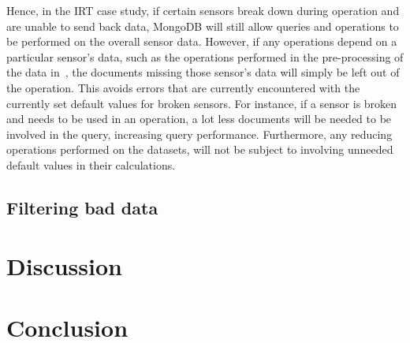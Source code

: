 \documentclass[a4paper,11pt]{article}
\begin{document}
Hence, in the IRT case study, if certain sensors break down during operation and are unable to send back data, MongoDB
will still allow queries and operations to be performed on the overall sensor data. However, if any operations depend on
a particular sensor's data, such as the operations performed in the pre-processing of the data
in~, the documents missing those sensor's data will simply be left out of the operation. This
avoids errors that are currently encountered with the currently set default values for broken sensors. For instance, if
a sensor is broken and needs to be used in an operation, a lot less documents will be needed to be involved in the
query, increasing query performance. Furthermore, any reducing operations performed on the datasets, will not be subject
to involving unneeded default values in their calculations.



\subsection{Filtering bad data} %
\label{sub:filtering_bad_data}






\newpage

\section{Discussion} %
\label{sec:discussion}



\newpage

\section{Conclusion} %
\label{sec:conclusion}


\newpage                            %



\end{document}
